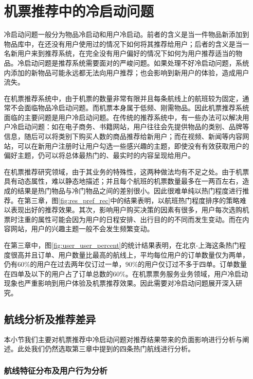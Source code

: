 
\chapter{机票推荐中的冷启动问题}
\label{chap:cold}

冷启动问题一般分为物品冷启动和用户冷启动。前者的含义是当一件物品新添加到物品库中，在还没有用户使用过的情况下如何将其推荐给用户；后者的含义是当一名新用户来到推荐系统，在完全没有用户偏好的情况下如何为用户推荐适当的物品。冷启动问题是推荐系统需要面对的严峻问题。如果处理不好冷启动问题，系统内添加的新物品可能永远都无法向用户推荐；也会影响到新用户的体验，造成用户流失。

在机票推荐系统中，由于机票的数量非常有限并且每条航线上的航班较为固定，通常不会面临物品冷启动问题。而机票本身属于低频、刚需物品。因此机票推荐系统面临的主要问题是用户冷启动问题。在传统的推荐系统中，有一些办法可以解决用户冷启动问题：如在电子商务、书籍网站，用户往往会先提供物品的类别、品牌等信息，随后可以将类别下购买人数的商品推荐给新用户；而在视频、新闻等内容网站，可以在新用户注册时让用户勾选一些感兴趣的主题，即使没有有效获取用户的偏好主题，仍可以将总体最热门的、最实时的内容呈现给用户。

在机票推荐研究领域，由于其业务的特殊性，这两种做法均有不足之处。由于机票具有动态属性，难以静态地描述；并且每个航班的机票数量最多在一两百左右，造成的结果是热门物品与冷门物品之间的差别很小。因此很难单纯以热门程度进行推荐。在第三章，图\ref{fig:res_pref_rec}中的结果表明，以航班热门程度排序的策略难以表现出好的推荐效果。其次，影响用户购买决策的因素有很多，用户每次选购机票时注重的属性可能会因为用户的日程安排、出行目的的不同而发生变动。而在内容网站，用户的兴趣主题一般不会发生频繁变动。

在第三章中，图\ref{fig:user_user_percent}的统计结果表明，在北京-上海这条热门程度很高并且订单、用户数量比最高的航线上，平均每位用户的订单数量仅为两单，仍有$60\%$的用户在过去两年仅订过一单，$90\%$的用户仅订过不多于四单。订单数量在四单及以下的用户占了订单总数的$60\%$。在机票票务服务业务领域，用户冷启动现象也严重影响到用户体验及机票推荐效果。因此需要对冷启动问题展开深入研究。


\section{航线分析及推荐差异}
本小节我们主要对机票推荐中冷启动问题对推荐结果带来的负面影响进行分析与阐述。此处我们仍然选取第三章中提到的四条热门航线进行分析。

\subsection{航线特征分布及用户行为分析}

